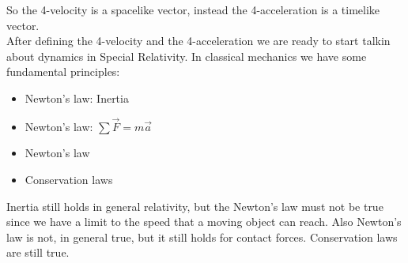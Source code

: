So the 4-velocity is a spacelike vector, instead the 4-acceleration is a timelike vector.\\
After defining the 4-velocity and the 4-acceleration we are ready to start talkin about dynamics in Special Relativity. In classical mechanics we have some fundamental principles:
\begin{itemize}
  \item Newton's  law: Inertia
  \item Newton's  law: $\sum \vec{F} = m\vec{a}$
  \item Newton's  law
  \item Conservation laws
\end{itemize}
Inertia still holds in general relativity, but the Newton's  law must not be true since we have a limit to the speed that a moving object can reach. Also Newton's  law is not, in general true, but it still holds for contact forces. Conservation laws are still true.
